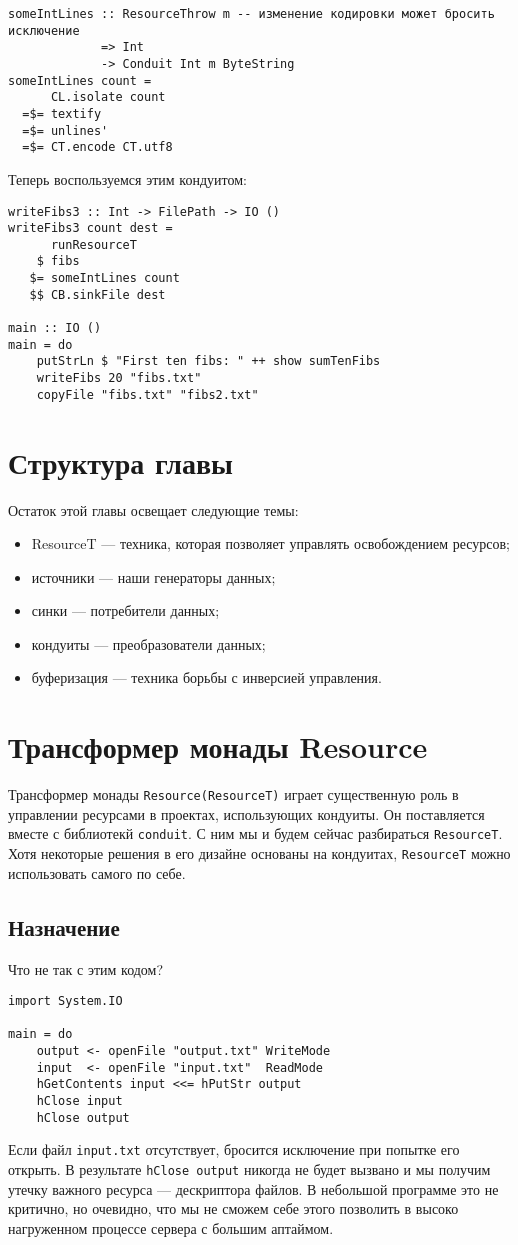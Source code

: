 \begin{lstlisting}
someIntLines :: ResourceThrow m -- изменение кодировки может бросить исключение
             => Int
             -> Conduit Int m ByteString
someIntLines count =
      CL.isolate count
  =$= textify
  =$= unlines'
  =$= CT.encode CT.utf8
\end{lstlisting}
Теперь воспользуемся этим кондуитом:
\begin{lstlisting}
writeFibs3 :: Int -> FilePath -> IO ()
writeFibs3 count dest =
      runResourceT
    $ fibs
   $= someIntLines count
   $$ CB.sinkFile dest

main :: IO ()
main = do
    putStrLn $ "First ten fibs: " ++ show sumTenFibs
    writeFibs 20 "fibs.txt"
    copyFile "fibs.txt" "fibs2.txt"
\end{lstlisting}

\section{Структура главы}

Остаток этой главы освещает следующие темы:
\begin{itemize}
 \item ResourceT --- техника, которая позволяет управлять освобождением ресурсов;
 \item источники --- наши генераторы данных;
 \item синки --- потребители данных;
 \item кондуиты --- преобразователи данных;
 \item буферизация --- техника борьбы с инверсией управления.
\end{itemize}

\section{Трансформер монады Resource}

Трансформер монады \verb*|Resource(ResourceT)| играет существенную роль в управлении
ресурсами в
проектах, использующих кондуиты. Он поставляется вместе с библиотекй \verb=conduit=. 
С ним мы и будем сейчас  разбираться \verb*|ResourceT|. Хотя некоторые решения в его
дизайне
основаны на кондуитах, \verb*|ResourceT| можно использовать самого по себе.

\subsection{Назначение}
Что не так с этим кодом?
\begin{lstlisting}
import System.IO

main = do
    output <- openFile "output.txt" WriteMode
    input  <- openFile "input.txt"  ReadMode
    hGetContents input <<= hPutStr output
    hClose input
    hClose output
\end{lstlisting}
Если файл \verb*|input.txt| отсутствует, бросится исключение при попытке его открыть. В
результате \lstinline'hClose output' никогда не будет вызвано и мы получим утечку важного
ресурса
 --- дескриптора файлов. В небольшой программе это не критично, но очевидно, что мы не
сможем себе этого позволить в высоко нагруженном процессе сервера с большим аптаймом.

